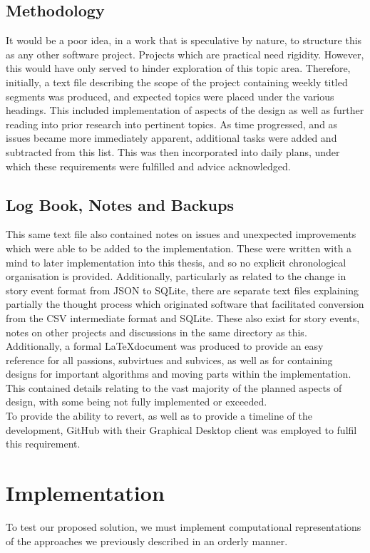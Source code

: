 \documentclass[11pt]{article}
\begin{document}
\subsection{Methodology}
It would be a poor idea, in a work that is speculative by nature, to structure this as any other software project. Projects which are practical need rigidity. However, this would have only served to hinder exploration of this topic area. Therefore, initially, a text file describing the scope of the project containing weekly titled segments was produced, and expected topics were placed under the various headings. This included implementation of aspects of the design as well as further reading into prior research into pertinent topics. As time progressed, and as issues became more immediately apparent, additional tasks were added and subtracted from this list. This was then incorporated into daily plans, under which these requirements were fulfilled and advice acknowledged. 

\subsection{Log Book, Notes and Backups} 
This same text file also contained notes on issues and unexpected improvements which were able to be added to the implementation. These were written with a mind to later implementation into this thesis, and so no explicit chronological organisation is provided. Additionally, particularly as related to the change in story event format from JSON to SQLite, there are separate text files explaining partially the thought process which originated software that facilitated conversion from the CSV intermediate format and SQLite. These also exist for story events, notes on other projects and discussions in the same directory as this. \\
Additionally, a formal \LaTeX document was produced to provide an easy reference for all passions, subvirtues and subvices, as well as for containing designs for important algorithms and moving parts within the implementation. This contained details relating to the vast majority of the planned aspects of design, with some being not fully implemented or exceeded. \\
To provide the ability to revert, as well as to provide a timeline of the development, GitHub with their Graphical Desktop client was employed to fulfil this requirement. 

\section{Implementation}
To test our proposed solution, we must implement computational representations of the approaches we previously described in an orderly manner.
\end{document}
